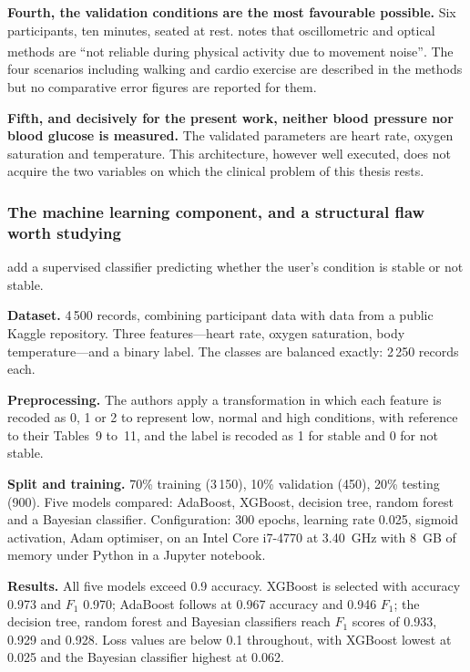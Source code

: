 \documentclass[12pt,a4paper,oneside]{report}
\newcommand{\bq}[1]{``#1''\textsuperscript{\dag}}
\begin{document}
\textbf{Fourth, the validation conditions are the most favourable possible.} Six participants, ten minutes, seated at rest. \Textcite{navarro2023} notes that oscillometric and optical methods are \bq{not reliable during physical activity due to movement noise}. The four scenarios including walking and cardio exercise are described in the methods but no comparative error figures are reported for them.

\textbf{Fifth, and decisively for the present work, neither blood pressure nor blood glucose is measured.} The validated parameters are heart rate, oxygen saturation and temperature. This architecture, however well executed, does not acquire the two variables on which the clinical problem of this thesis rests.

\subsubsection{The machine learning component, and a structural flaw worth studying}\label{sec:leakage}

\Textcite{efendi2025} add a supervised classifier predicting whether the user's condition is stable or not stable.

\textbf{Dataset.} 4\,500 records, combining participant data with data from a public Kaggle repository. Three features---heart rate, oxygen saturation, body temperature---and a binary label. The classes are balanced exactly: 2\,250 records each.

\textbf{Preprocessing.} The authors apply a transformation in which each feature is recoded as 0, 1 or 2 to represent low, normal and high conditions, with reference to their Tables~9 to~11, and the label is recoded as 1 for stable and 0 for not stable.

\textbf{Split and training.} 70\% training (3\,150), 10\% validation (450), 20\% testing (900). Five models compared: AdaBoost, XGBoost, decision tree, random forest and a Bayesian classifier. Configuration: 300 epochs, learning rate 0.025, sigmoid activation, Adam optimiser, on an Intel Core i7-4770 at 3.40~GHz with 8~GB of memory under Python in a Jupyter notebook.

\textbf{Results.} All five models exceed 0.9 accuracy. XGBoost is selected with accuracy 0.973 and $F_1$ 0.970; AdaBoost follows at 0.967 accuracy and 0.946 $F_1$; the decision tree, random forest and Bayesian classifiers reach $F_1$ scores of 0.933, 0.929 and 0.928. Loss values are below 0.1 throughout, with XGBoost lowest at 0.025 and the Bayesian classifier highest at 0.062.
\end{document}
